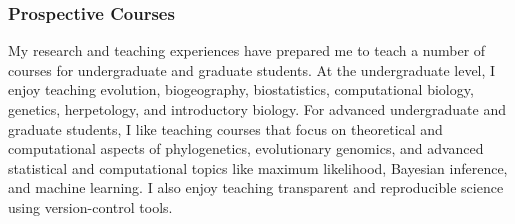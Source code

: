 

\subsubsection*{Prospective Courses}


My research and teaching experiences have prepared me to teach a number of
courses for undergraduate and graduate students.
At the undergraduate level, I enjoy teaching
evolution,
biogeography,
biostatistics,
computational biology,
genetics,
herpetology,
and
introductory biology.
For advanced undergraduate and graduate students, I like teaching courses
that focus on theoretical and computational aspects of
phylogenetics,
evolutionary genomics,
and
advanced statistical and computational topics like
maximum likelihood,
Bayesian inference,
and
machine learning.
I also enjoy teaching transparent and reproducible science using version-control tools.

